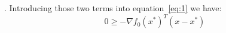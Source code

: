 \message{ !name(ass3_ChangLi.tex)}\documentclass[10pt,a4paper]{article}
\begin{document}
.
Introducing those two terms into equation~\ref{eq:1} we have:
$$
0\geq-\nabla f_0(x^*)^T(x-x^*)
$$





	\renewcommand\refname{Bibliography}
	
	
\end{document}

